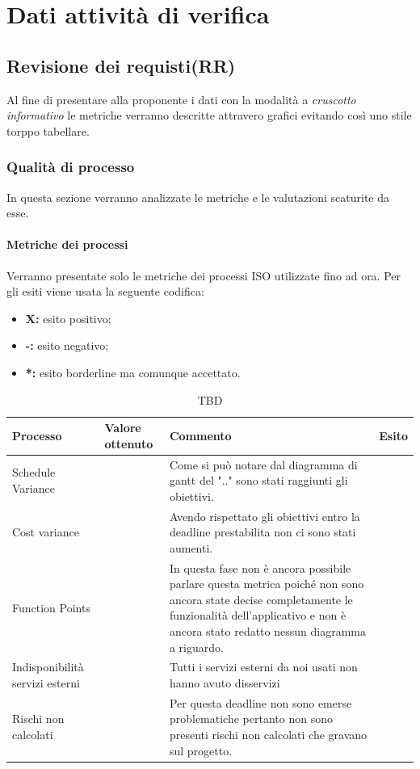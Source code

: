 \section{Dati attività di verifica}
\subsection{Revisione dei requisti(RR)}
Al fine di presentare alla proponente i dati con la modalità a \textit{cruscotto informativo} le metriche verranno descritte attravero grafici evitando così uno stile torppo tabellare.
\subsubsection{Qualità di processo}
In questa sezione verranno analizzate le metriche e le valutazioni scaturite da esse.
\clearpage
\paragraph{Metriche dei processi}
\hspace{10cm} %
\newline Verranno presentate solo le metriche dei processi ISO utilizzate fino ad ora.
Per gli esiti viene usata la seguente codifica:
\begin{itemize}
	\item \textbf{X: } esito positivo;
	\item \textbf{-: } esito negativo;
	\item \textbf{*: } esito borderline ma comunque accettato.
\end{itemize}
\begin{table}[!htbp]
	\centering
	\renewcommand{\arraystretch}{3} 
	\begin{tabular}{|l|l|l|l|}
		\rowcolor{orange!50}
		\hline
		\textbf{Processo} & \parbox{2cm}{\textbf{Valore ottenuto}} & \textbf{Commento} & \textbf{Esito} \\
		\hline
		Schedule Variance & & \parbox{8cm}{Come si può notare dal diagramma di gantt del ".." sono stati raggiunti gli obiettivi.} & \\
		\hline
		Cost variance & & \parbox{8cm}{Avendo rispettato gli obiettivi entro la deadline prestabilita non ci sono stati aumenti.} &\\
		\hline
		Function Points & & \parbox{8cm}{In questa fase non è ancora possibile parlare questa metrica poiché non sono ancora state decise completamente le funzionalità dell'applicativo e non è ancora stato redatto nessun diagramma a riguardo.} & \\
		\hline
		\parbox{2.5cm}{Indisponibilità servizi esterni} & & \parbox{8cm}{Tutti i servizi esterni da noi usati non hanno avuto disservizi } & \\
		\hline
		\parbox{2.5cm}{Rischi non calcolati} & & \parbox{8cm}{Per questa deadline non sono emerse problematiche pertanto non sono presenti rischi non calcolati che gravano sul progetto.} & \\
		\hline
	\end{tabular}
	\caption{TBD}
\end{table}
\clearpage
